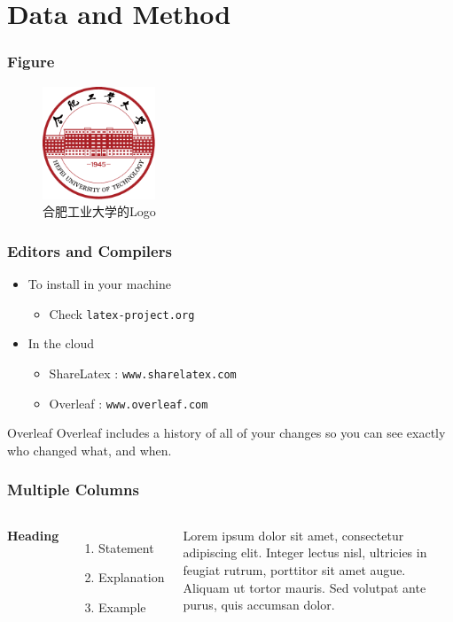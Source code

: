 \documentclass[aspectratio=169]{beamer}
\begin{document}
\section{Data and Method}

\begin{frame}
\frametitle{Figure}
\vspace{-0.3cm}
\begin{figure}[h]
	\centering
	\includegraphics[width=0.3\textwidth]{images/HFUT_badge.pdf}
	\caption{合肥工业大学的Logo}
\end{figure}
\end{frame}


\begin{frame}
\frametitle{Editors and Compilers}
\begin{itemize}
	\item To install in your machine
	\begin{itemize}
		\item Check \texttt{latex-project.org}
	\end{itemize}
	\item In the cloud
	\begin{itemize}
		\item ShareLatex : \texttt{www.sharelatex.com}
		\item Overleaf : \texttt{www.overleaf.com}
	\end{itemize}
\end{itemize}
\vskip 1cm
\begin{block}{Overleaf}
    Overleaf includes a history of all of your changes so you can see exactly who changed what, and when. 
\end{block}
\end{frame}


\begin{frame}
\frametitle{Multiple Columns}
\begin{columns}[c]
\textbf{Heading}
\begin{enumerate}
	\item Statement
	\item Explanation
	\item Example
\end{enumerate}
Lorem ipsum dolor sit amet, consectetur adipiscing elit. Integer lectus nisl, ultricies in feugiat rutrum, porttitor sit amet augue. Aliquam ut tortor mauris. Sed volutpat ante purus, quis accumsan dolor.
\end{columns}
\end{frame}
\end{document}
